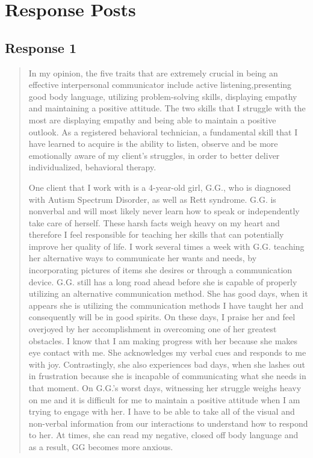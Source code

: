 
\section{Response Posts}
  \subsection{Response 1}
    \begin{quotation}
      In my opinion, the five traits that are extremely crucial in being an
        effective interpersonal communicator include active listening,presenting
        good body language, utilizing problem-solving skills, displaying empathy
        and maintaining a positive attitude. The two skills that I struggle with
        the most are displaying empathy and being able to maintain a positive
        outlook. As a registered behavioral technician, a fundamental skill that
        I have learned to acquire is the ability to listen, observe and be more
        emotionally aware of my client’s struggles, in order to better deliver
        individualized, behavioral therapy.

      One client that I work with is a 4-year-old girl, G.G., who is diagnosed
        with Autism Spectrum Disorder, as well as Rett syndrome. G.G. is
        nonverbal and will most likely never learn how to speak or independently
        take care of herself.  These harsh facts weigh heavy on my heart and
        therefore I feel responsible for teaching her skills that can
        potentially improve her quality of life.  I work several times a week
        with G.G. teaching her alternative ways to communicate her wants and
        needs, by incorporating pictures of items she desires or through a
        communication device. G.G. still has a long road ahead before she is
        capable of properly utilizing an alternative communication method.
        She has good days, when it appears she is utilizing the communication
        methods I have taught her and consequently will be in good spirits. On
        these days, I praise her and feel overjoyed by her accomplishment in
        overcoming one of her greatest obstacles.  I know that I am making
        progress with her because she makes eye contact with me. She
        acknowledges my verbal cues and responds to me with joy. Contrastingly,
        she also experiences bad days, when she lashes out in frustration
        because she is incapable of communicating what she needs in that moment.
        On G.G.’s worst days, witnessing her struggle weighs heavy on me and it
        is difficult for me to maintain a positive attitude when I am trying to
        engage with her.  I have to be able to take all of the visual and
        non-verbal information from our interactions to understand how to
        respond to her. At times, she can read my negative, closed off body
        language and as a result, GG becomes more anxious.


\end{quotation}
